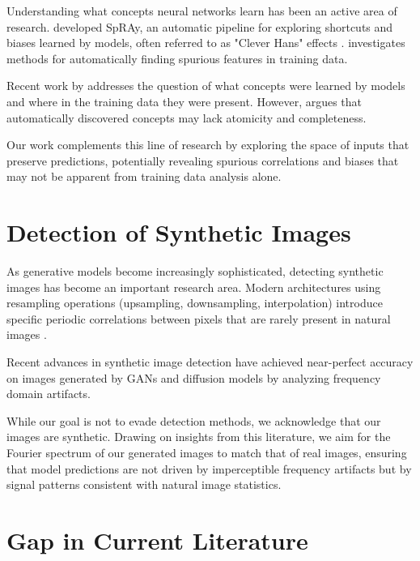 \documentclass[licencjacka,en]{pracamgr}
\begin{document}
Understanding what concepts neural networks learn has been an active area of research. \citep{Lapuschkin_2019} developed SpRAy, an automatic pipeline for exploring shortcuts and biases learned by models, often referred to as "Clever Hans" effects \citep{pfungst1911cleverHans}. \citep{neuhaus2023spuriousfeatureslargescale} investigates methods for automatically finding spurious features in training data.

Recent work by \citep{dreyer2025mechanisticunderstandingvalidationlarge} addresses the question of what concepts were learned by models and where in the training data they were present. However, \citep{leask2025sparse} argues that automatically discovered concepts may lack atomicity and completeness.

Our work complements this line of research by exploring the space of inputs that preserve predictions, potentially revealing spurious correlations and biases that may not be apparent from training data analysis alone.

\section{Detection of Synthetic Images}

As generative models become increasingly sophisticated, detecting synthetic images has become an important research area. Modern architectures using resampling operations (upsampling, downsampling, interpolation) introduce specific periodic correlations between pixels that are rarely present in natural images \citep{Popescu2005ExposingDF}.

Recent advances in synthetic image detection \citep{zhang2019detectingsimulatingartifactsgan, wang2023dirediffusiongeneratedimagedetection, zhang2023diffusion} have achieved near-perfect accuracy on images generated by GANs and diffusion models by analyzing frequency domain artifacts.

While our goal is not to evade detection methods, we acknowledge that our images are synthetic. Drawing on insights from this literature, we aim for the Fourier spectrum of our generated images to match that of real images, ensuring that model predictions are not driven by imperceptible frequency artifacts but by signal patterns consistent with natural image statistics.

\section{Gap in Current Literature}
\end{document}
